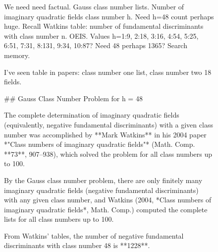 \begin{figure}[t]
\begin{reasoncol}[equal height group=reasX2]
  \raggedright We need need factual. Gauss class number lists. Number of imaginary quadratic fields class number h. Need h=48 count perhaps huge. Recall Watkins table: number of fundamental discriminants with class number n. OEIS. Values h=1:9, 2:18, 3:16, 4:54, 5:25, 6:51, 7:31, 8:131, 9:34, 10:87? Need 48 perhaps 1365? Search memory.\par
  I've seen table in papers: class number one list, class number two 18 fields.\par\vspace{3pt}\elide
\end{reasoncol}
\vspace{12pt}
\noindent
\begin{answercol}[equal height group=ansX2]
  \caret{}\par\vspace{4pt}
  \raggedright \#\# Gauss Class Number Problem for h = 48\par\vspace{2pt}
  The complete determination of imaginary quadratic fields (equivalently, negative fundamental discriminants) with a given class number was accomplished by **Mark Watkins** in his 2004 paper *"Class numbers of imaginary quadratic fields"* (Math. Comp. **73**, 907--938), which solved the problem for all class numbers up to 100.\par\vspace{3pt}\elide
\end{answercol}\hspace{\columnsep}%
\begin{answercol}[equal height group=ansX2]
  \caret{}\par\vspace{4pt}
  \raggedright By the Gauss class number problem, there are only finitely many imaginary quadratic fields (negative fundamental discriminants) with any given class number, and Watkins (2004, *Class numbers of imaginary quadratic fields*, Math. Comp.) computed the complete lists for all class numbers up to 100.\par\vspace{2pt}
  From Watkins' tables, the number of negative fundamental discriminants with class number 48 is **1228**.\par\vspace{3pt}\elide
\end{answercol}\hspace{\columnsep}%
\begin{answercol}[equal height group=ansX2]

\end{answercol}
\end{figure}
